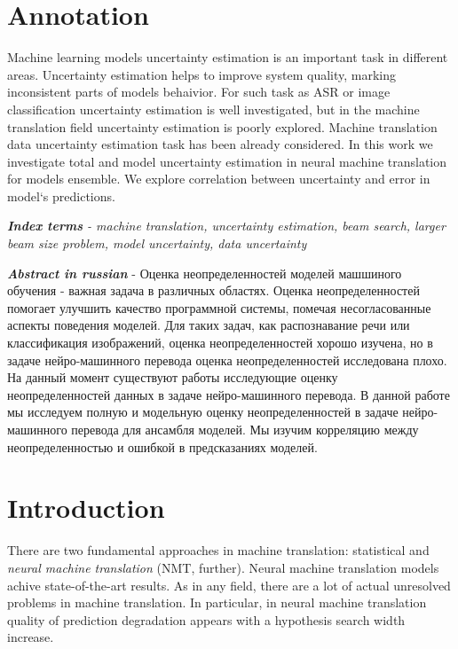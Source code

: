 \documentclass[a4paper,14pt]{extarticle}
\begin{document}
	\newpage

	{
		\hypersetup{linkcolor=black}
		\tableofcontents
	}

	\newpage
	
	\section{Annotation}
	Machine learning models uncertainty estimation is an important task in different areas. Uncertainty estimation helps to improve system quality, marking inconsistent parts of models behaivior. For such task as ASR or image classification uncertainty estimation is well investigated, but in the machine translation field uncertainty estimation is poorly explored. Machine translation data uncertainty estimation task has been already considered. In this work we investigate total and model uncertainty estimation in neural machine translation for models ensemble. We explore correlation between uncertainty and error in model`s predictions.
	
	\textit{\textbf{Index terms} - machine translation, uncertainty estimation, beam search, larger beam size problem, model uncertainty, data uncertainty}
	
	\textit{\textbf{Abstract in russian}} - Оценка неопределенностей моделей машшиного обучения - важная задача в различных областях. Оценка неопределенностей помогает улучшить качество программной системы, помечая несогласованные аспекты поведения моделей. Для таких задач, как распознавание речи или классификация изображений, оценка неопределенностей хорошо изучена, но в задаче нейро-машинного перевода оценка неопределенностей исследована плохо. На данный момент существуют работы исследующие оценку \\ неопределенностей данных в задаче нейро-машинного перевода. В данной работе мы исследуем полную и модельную оценку неопределенностей в задаче нейро-машинного перевода для ансамбля моделей. Мы изучим корреляцию между неопределенностью и ошибкой в предсказаниях моделей.
		
	\newpage
		
	\section{Introduction}
	There are two fundamental approaches in machine translation: statistical and \textit{neural machine translation} (NMT, further). Neural machine translation models achive state-of-the-art results. As in any field, there are a lot of actual unresolved problems in machine translation. In particular, in neural machine translation  quality of prediction degradation appears with a hypothesis search width increase.
	
\end{document}
